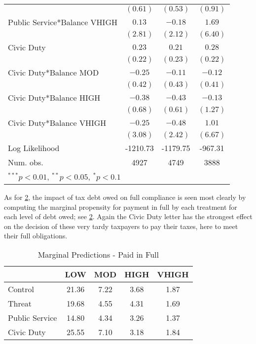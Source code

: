 \documentclass[12pt,titlepage]{article}
\begin{document}
\begin{table}[htbp]
\begin{center}
\begin{tabular}{|l|c|c|c|}
                             & $(0.61)$      & $(0.53)$      & $(0.91)$      \\
Public Service*Balance VHIGH & $0.13$        & $-0.18$       & $1.69$        \\
                             & $(2.81)$      & $(2.12)$      & $(6.40)$      \\
Civic Duty                   & $0.23$        & $0.21$        & $0.28$        \\
                             & $(0.22)$      & $(0.23)$      & $(0.22)$      \\
Civic Duty*Balance MOD       & $-0.25$       & $-0.11$       & $-0.12$       \\
                             & $(0.42)$      & $(0.43)$      & $(0.41)$      \\
Civic Duty*Balance HIGH      & $-0.38$       & $-0.43$       & $-0.13$       \\
                             & $(0.68)$      & $(0.61)$      & $(1.27)$      \\
Civic Duty*Balance VHIGH     & $-0.25$       & $-0.48$       & $1.01$        \\
                             & $(3.08)$      & $(2.42)$      & $(6.67)$      \\
\hline
Log Likelihood               & -1210.73      & -1179.75      & -967.31       \\
Num. obs.                    & 4927          & 4749          & 3888          \\
\hline
\multicolumn{4}{l}{\scriptsize{$^{***}p<0.01$, $^{**}p<0.05$, $^*p<0.1$}}
\end{tabular}
\label{table:pf_log_II}
\end{center}
\end{table}


As for \ref{table:modelI_marg}, the impact of tax debt owed on full compliance is
seen most clearly by computing the marginal propensity for payment in
full by each treatment for each level of debt owed; see \ref{table:modelI_marg}.
Again the Civic Duty letter has the strongest effect on the decision
of these very tardy taxpayers to pay their taxes, here to meet their
full obligations.


\begin{table}[htbp]
\centering
\begin{tabular}{|l|c|c|c|c|}
  \hline
 & LOW & MOD & HIGH & VHIGH \\ 
  \hline
Control & 21.36 & 7.22 & 3.68 & 1.87 \\ 
  Threat & 19.68 & 4.55 & 4.31 & 1.69 \\ 
  Public Service & 14.80 & 4.34 & 3.26 & 1.37 \\ 
  Civic Duty & 25.55 & 7.10 & 3.18 & 1.84 \\ 
   \hline
\end{tabular}
\caption{Marginal Predictions - Paid in Full} 
\label{table:modelI_marg}
\end{table}
\end{document}
